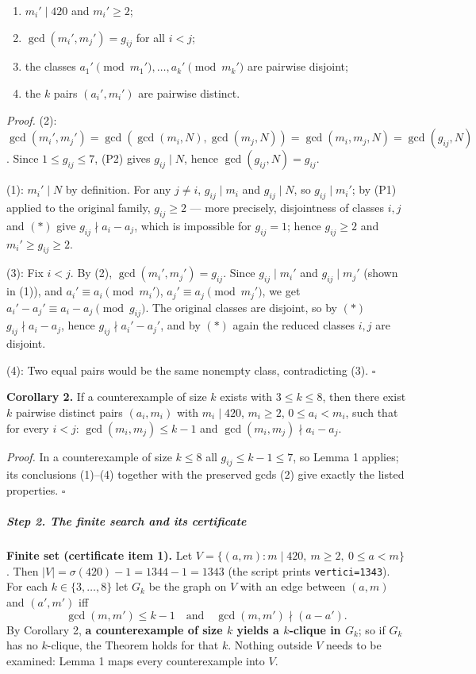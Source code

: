 \begin{enumerate}
\def\labelenumi{\arabic{enumi}.}
\tightlist
\item
  \(m_i' \mid 420\) and \(m_i'\ge 2\);
\item
  \(\gcd(m_i',m_j')=g_{ij}\) for all \(i<j\);
\item
  the classes \(a_1' \pmod{m_1'},\dots,a_k'\pmod{m_k'}\) are pairwise
  disjoint;
\item
  the \(k\) pairs \((a_i',m_i')\) are pairwise distinct.
\end{enumerate}

\emph{Proof.} (2):
\(\gcd(m_i',m_j')=\gcd(\gcd(m_i,N),\gcd(m_j,N))=\gcd(m_i,m_j,N)=\gcd(g_{ij},N)\).
Since \(1\le g_{ij}\le 7\), (P2) gives \(g_{ij}\mid N\), hence
\(\gcd(g_{ij},N)=g_{ij}\).

(1): \(m_i'\mid N\) by definition. For any \(j\ne i\),
\(g_{ij}\mid m_i\) and \(g_{ij}\mid N\), so \(g_{ij}\mid m_i'\); by (P1)
applied to the original family, \(g_{ij}\ge 2\) --- more precisely,
disjointness of classes \(i,j\) and \((*)\) give
\(g_{ij}\nmid a_i-a_j\), which is impossible for \(g_{ij}=1\); hence
\(g_{ij}\ge2\) and \(m_i'\ge g_{ij}\ge2\).

(3): Fix \(i<j\). By (2), \(\gcd(m_i',m_j')=g_{ij}\). Since
\(g_{ij}\mid m_i'\) and \(g_{ij}\mid m_j'\) (shown in (1)), and
\(a_i'\equiv a_i \pmod{m_i'}\), \(a_j'\equiv a_j\pmod{m_j'}\), we get
\(a_i'-a_j'\equiv a_i-a_j \pmod{g_{ij}}\). The original classes are
disjoint, so by \((*)\) \(g_{ij}\nmid a_i-a_j\), hence
\(g_{ij}\nmid a_i'-a_j'\), and by \((*)\) again the reduced classes
\(i,j\) are disjoint.

(4): Two equal pairs would be the same nonempty class, contradicting
(3). \(\square\)

\textbf{Corollary 2.} If a counterexample of size \(k\) exists with
\(3\le k\le8\), then there exist \(k\) pairwise distinct pairs
\((a_i,m_i)\) with \(m_i\mid 420\), \(m_i\ge2\), \(0\le a_i<m_i\), such
that for every \(i<j\): \(\gcd(m_i,m_j)\le k-1\) and
\(\gcd(m_i,m_j)\nmid a_i-a_j\).

\emph{Proof.} In a counterexample of size \(k\le 8\) all
\(g_{ij}\le k-1\le 7\), so Lemma 1 applies; its conclusions (1)--(4)
together with the preserved gcds (2) give exactly the listed properties.
\(\square\)

\subparagraph{Step 2. The finite search and its
certificate}\label{step-2.-the-finite-search-and-its-certificate}

\textbf{Finite set (certificate item 1).} Let
\(V=\{(a,m): m\mid 420,\ m\ge2,\ 0\le a<m\}\). Then
\(|V|=\sigma(420)-1=1344-1=1343\) (the script prints
\texttt{vertici=1343}). For each \(k\in\{3,\dots,8\}\) let \(G_k\) be
the graph on \(V\) with an edge between \((a,m)\) and \((a',m')\) iff
\[\gcd(m,m')\le k-1\quad\text{and}\quad \gcd(m,m')\nmid (a-a').\] By
Corollary 2, \textbf{a counterexample of size \(k\) yields a
\(k\)-clique in \(G_k\)}; so if \(G_k\) has no \(k\)-clique, the Theorem
holds for that \(k\). Nothing outside \(V\) needs to be examined: Lemma
1 maps every counterexample into \(V\).


